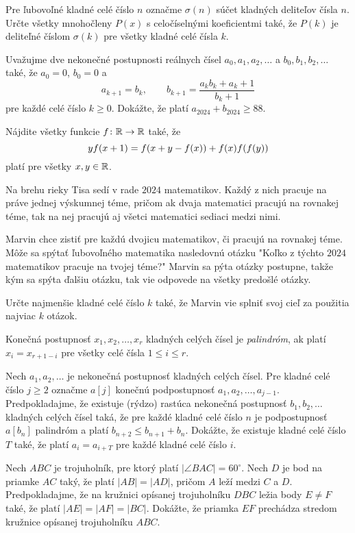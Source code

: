 {%
Pre ľubovoľné kladné celé číslo $n$ označme $\sigma(n)$ súčet kladných deliteľov čísla $n$.
Určte všetky mnohočleny $P(x)$ s celočíselnými koeficientmi také, že $P(k)$ je deliteľné číslom $\sigma(k)$ pre všetky kladné celé čísla $k$.}

{%
Uvažujme dve nekonečné postupnosti reálnych čísel $a_0,a_1,a_2,\ldots$ a $b_0,b_1,b_2,\ldots$ také, že  $a_0 = 0$, $b_0 = 0$ a
$$
a_{k+1} = b_k, \qquad b_{k+1} = \frac{a_k b_k + a_k + 1}{b_k + 1}
$$
pre každé celé číslo $k \geq 0$.
Dokážte, že platí $a_{2024} + b_{2024} \geq 88$.}

{%
Nájdite všetky funkcie $f \colon \Bbb R \to \Bbb R$ také, že
$$
\postdisplaypenalty=10000
yf(x+1) = f(x+y-f(x)) + f(x)f(f(y))
$$
platí pre všetky $x, y \in \Bbb R$.}

{%
Na brehu rieky Tisa sedí v rade $2024$ matematikov. Každý z nich pracuje na práve jednej výskumnej téme, pričom ak dvaja matematici pracujú na rovnakej téme, tak na nej pracujú aj všetci matematici sediaci medzi nimi.

Marvin chce zistiť pre každú dvojicu matematikov, či pracujú na rovnakej téme. Môže sa spýtať ľubovoľného matematika nasledovnú otázku "Koľko z týchto $2024$ matematikov pracuje na tvojej téme?" Marvin sa pýta otázky postupne, takže kým sa spýta ďalšiu otázku, tak vie odpovede na všetky predošlé otázky.

Určte najmenšie kladné celé číslo $k$ také, že Marvin vie splniť svoj cieľ za použitia najviac $k$ otázok.}

{%
Konečná postupnosť $x_1, x_2, \ldots, x_r$ kladných celých čísel je \emph{palindróm}, ak platí $x_i=x_{r+1-i}$ pre všetky celé čísla $1\leq i \leq r$.

Nech $a_1, a_2, \ldots$ je nekonečná postupnosť kladných celých čísel. Pre kladné celé číslo $j\geq 2$ označme $a[j]$ konečnú podpostupnosť $a_1, a_2, \ldots, a_{j-1}$. Predpokladajme, že existuje (rýdzo) rastúca nekonečná postupnosť $b_1, b_2, \ldots$ kladných celých čísel taká, že pre každé kladné celé číslo $n$ je podpostupnosť $a[b_n]$ palindróm a platí $b_{n+2}\leq b_{n+1}+b_n$. Dokážte, že existuje kladné celé číslo $T$ také, že platí $a_i=a_{i+T}$ pre každé kladné celé číslo $i$.}

{%
Nech $ABC$ je trojuholník, pre ktorý platí $|\angle BAC| = 60^\circ$.
Nech $D$ je bod na priamke $AC$ taký, že platí $|AB| = |AD|$, pričom $A$ leží medzi $C$ a $D$.
Predpokladajme, že na kružnici opísanej trojuholníku $DBC$ ležia body $E \ne F$ také, že platí $|AE| =  |AF| = |BC|$.
Dokážte, že priamka $EF$ prechádza stredom kružnice opísanej trojuholníku $ABC$.}

